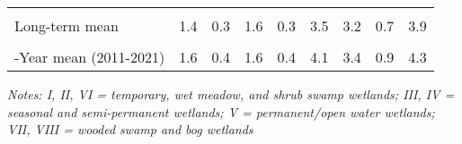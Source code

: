 \documentclass[
  12pt,
]{article}
\begin{document}
\begin{table}[!h]
{\begin{threeparttable}
\begin{tabular}[t]{>{\centering\arraybackslash}m{8em}cccccccc}
\cellcolor{gray!6}{\% Change from previous year} & \cellcolor{gray!6}{-74.0\%} & \cellcolor{gray!6}{-58.8\%} & \cellcolor{gray!6}{11.0\%} & \cellcolor{gray!6}{-77.0\%} & \cellcolor{gray!6}{-49.8\%} & \cellcolor{gray!6}{33.0\%} & \cellcolor{gray!6}{-57.3\%} & \cellcolor{gray!6}{7.5\%}\\
Long-term mean & 1.4 & 0.3 & 1.6 & 0.3 & 3.5 & 3.2 & 0.7 & 3.9\\
\cellcolor{gray!6}{\% Change from long-term mean} & \cellcolor{gray!6}{-38.6\%} & \cellcolor{gray!6}{28.3\%} & \cellcolor{gray!6}{25.3\%} & \cellcolor{gray!6}{-36.7\%} & \cellcolor{gray!6}{-3.9\%} & \cellcolor{gray!6}{50.0\%} & \cellcolor{gray!6}{-9.0\%} & \cellcolor{gray!6}{39.8\%}\\
10-Year mean (2011-2021) & 1.6 & 0.4 & 1.6 & 0.4 & 4.1 & 3.4 & 0.9 & 4.3\\
\bottomrule
\end{tabular}
\begin{tablenotes}
\small
\item \textit{Notes: I, II, VI = temporary, wet meadow, and shrub swamp
    wetlands; III, IV = seasonal and semi-permanent wetlands; V =
    permanent/open water wetlands; VII, VIII = wooded swamp and bog wetlands} 
\item 
\end{tablenotes}
\end{threeparttable}}
\end{table}

\newpage
\end{document}
